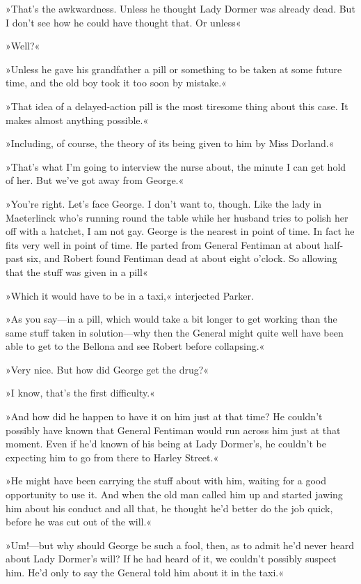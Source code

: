»That's the awkwardness. Unless he thought Lady Dormer was already dead. But I don't see how he could have thought that. Or unless\longdash«

»Well?«

»Unless he gave his grandfather a pill or something to be taken at some future time, and the old boy took it too soon by mistake.«

»That idea of a delayed-action pill is the most tiresome thing about this case. It makes almost anything possible.«

»Including, of course, the theory of its being given to him by Miss Dorland.«

»That's what I'm going to interview the nurse about, the minute I can get hold of her. But we've got away from George.«

»You're right. Let's face George. I don't want to, though. Like the lady in Maeterlinck who's running round the table while her husband tries to polish her off with a hatchet, I am not gay. George is the nearest in point of time. In fact he fits very well in point of time. He parted from General Fentiman at about half-past six, and Robert found Fentiman dead at about eight o'clock. So allowing that the stuff was given in a pill\longdash«

»Which it would have to be in a taxi,« interjected Parker.

»As you say—in a pill, which would take a bit longer to get working than the same stuff taken in solution—why then the General might quite well have been able to get to the Bellona and see Robert before collapsing.«

»Very nice. But how did George get the drug?«

»I know, that's the first difficulty.«

»And how did he happen to have it on him just at that time? He couldn't possibly have known that General Fentiman would run across him just at that moment. Even if he'd known of his being at Lady Dormer's, he couldn't be expecting him to go from there to Harley Street.«

»He might have been carrying the stuff about with him, waiting for a good opportunity to use it. And when the old man called him up and started jawing him about his conduct and all that, he thought he'd better do the job quick, before he was cut out of the will.«

»Um!—but why should George be such a fool, then, as to admit he'd never heard about Lady Dormer's will? If he had heard of it, we couldn't possibly suspect him. He'd only to say the General told him about it in the taxi.«

